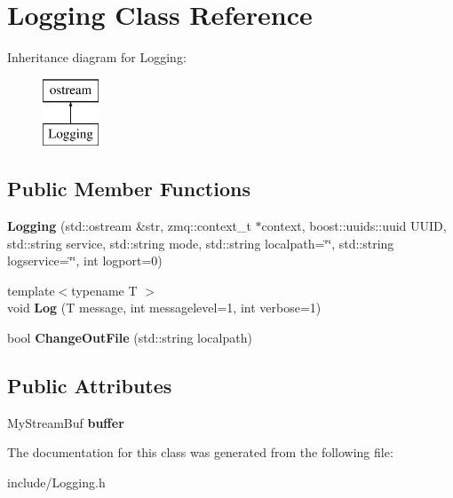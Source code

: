 \hypertarget{classLogging}{\section{Logging Class Reference}
\label{classLogging}
}
Inheritance diagram for Logging\-:\begin{figure}[H]
\begin{center}
\leavevmode
\includegraphics[height=2.000000cm]{classLogging}
\end{center}
\end{figure}
\subsection*{Public Member Functions}
\begin{DoxyCompactItemize}
\item 
\hypertarget{classLogging_ae7cc7299c697019f273b75cbfefff848}{{\bfseries Logging} (std\-::ostream \&str, zmq\-::context\-\_\-t $\ast$context, boost\-::uuids\-::uuid U\-U\-I\-D, std\-::string service, std\-::string mode, std\-::string localpath=\char`\"{}\char`\"{}, std\-::string logservice=\char`\"{}\char`\"{}, int logport=0)}\label{classLogging_ae7cc7299c697019f273b75cbfefff848}

\item 
\hypertarget{classLogging_af7839ee68729b066da269cc012b1fcc9}{{\footnotesize template$<$typename T $>$ }\\void {\bfseries Log} (T message, int messagelevel=1, int verbose=1)}\label{classLogging_af7839ee68729b066da269cc012b1fcc9}

\item 
\hypertarget{classLogging_a7a0c89c152ad81fb41a849ed9d81e429}{bool {\bfseries Change\-Out\-File} (std\-::string localpath)}\label{classLogging_a7a0c89c152ad81fb41a849ed9d81e429}

\end{DoxyCompactItemize}
\subsection*{Public Attributes}
\begin{DoxyCompactItemize}
\item 
\hypertarget{classLogging_a9622376d4c126c163334149cabc98bcc}{My\-Stream\-Buf {\bfseries buffer}}\label{classLogging_a9622376d4c126c163334149cabc98bcc}

\end{DoxyCompactItemize}


The documentation for this class was generated from the following file\-:\begin{DoxyCompactItemize}
\item 
include/Logging.\-h\end{DoxyCompactItemize}

